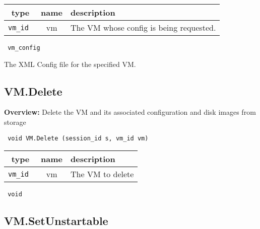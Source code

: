  
\vspace{0.3cm}
\begin{tabular}{|c|c|p{7cm}|}
 \hline
{\bf type} & {\bf name} & {\bf description} \\ \hline
{\tt vm\_id } & vm & The VM whose config is being requested. \\ \hline 

\end{tabular}

\vspace{0.3cm}

{\tt 
vm\_config
}


The XML Config file for the specified VM.
\vspace{0.3cm}
\vspace{0.3cm}
\vspace{0.3cm}

\subsection{VM.Delete}

{\bf Overview:} 
Delete the VM and its associated configuration and disk images from storage

\begin{verbatim} void VM.Delete (session_id s, vm_id vm)\end{verbatim}



 
\vspace{0.3cm}
\begin{tabular}{|c|c|p{7cm}|}
 \hline
{\bf type} & {\bf name} & {\bf description} \\ \hline
{\tt vm\_id } & vm & The VM to delete \\ \hline 

\end{tabular}

\vspace{0.3cm}

{\tt 
void
}



\vspace{0.3cm}
\vspace{0.3cm}
\vspace{0.3cm}

\subsection{VM.SetUnstartable}

